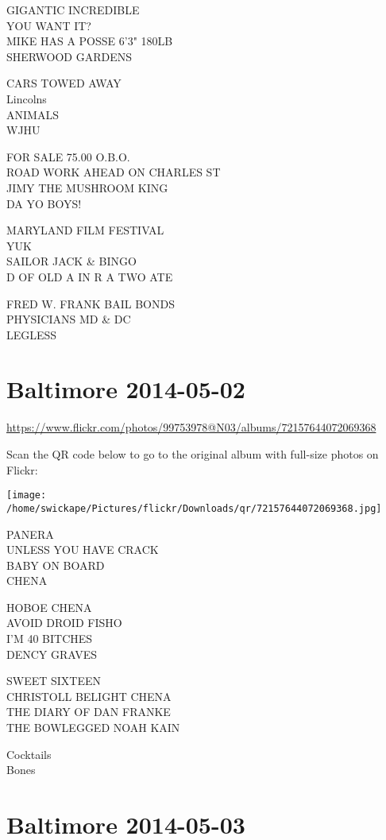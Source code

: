 \documentclass[10pt,letterpaper]{article}
\begin{document}
GIGANTIC INCREDIBLE\\
YOU WANT IT?\\
MIKE HAS A POSSE 6'3" 180LB\\
SHERWOOD GARDENS

CARS TOWED AWAY\\
Lincolns\\
ANIMALS\\
WJHU

FOR SALE 75.00 O.B.O.\\
ROAD WORK AHEAD ON CHARLES ST\\
JIMY THE MUSHROOM KING\\
DA YO BOYS!

MARYLAND FILM FESTIVAL\\
YUK\\
SAILOR JACK \& BINGO\\
D OF OLD A IN R A TWO ATE

FRED W. FRANK BAIL BONDS\\
PHYSICIANS MD \& DC\\
LEGLESS


\section*{Baltimore 2014-05-02}

\url{https://www.flickr.com/photos/99753978@N03/albums/72157644072069368}

Scan the QR code below to go to the original album with full-size photos on Flickr:

\texttt{[image: /home/swickape/Pictures/flickr/Downloads/qr/72157644072069368.jpg]}


PANERA\\
UNLESS YOU HAVE CRACK\\
BABY ON BOARD\\
CHENA

HOBOE CHENA\\
AVOID DROID FISHO\\
I'M 40 BITCHES\\
DENCY GRAVES

SWEET SIXTEEN\\
CHRISTOLL BELIGHT CHENA\\
THE DIARY OF DAN FRANKE\\
THE BOWLEGGED NOAH KAIN

Cocktails\\
Bones


\section*{Baltimore 2014-05-03}
\end{document}
